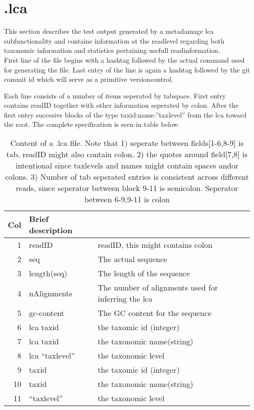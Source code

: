 \documentclass[10pt]{article}
\begin{document}
\section{.lca} \label{sec:lca}
This section describes the test output generated by a metadamage lca subfunctionality and contains information at the readlevel regarding both taxonomic information and statistics pertaining usefull readinformation.\\

First line of the file begins with a hashtag followed by the actual command used for generating the file. Last entry of the line is again a hashtag followed by the git commit id which will serve as a primitive versioncontrol.

Each line consists of a number of items seperated by tabspace. First entry contains readID together with other information seperated by colon. After the first entry succesive blocks of the type taxid:name:''taxlevel'' from the lca toward the root. The complete specification is seen in table below.

\begin{table}[h]
\begin{tabular}{rll}
  \hline
  {\bf Col} & {\bf Brief description} \\
  \hline
  1 & {\sf readID} & readID, this might contains colon\\
  2 & {\sf seq} & The actual sequence\\
  3 & {\sf length(seq)} & The length of the sequence\\
  4 & {\sf nAlignments} & The number of alignments used for inferring the lca\\
  5 & {\sf gc-content} & The GC content for the sequence\\\hline\hline
  6 & {\sf lca taxid} & the taxomic id (integer)\\
  7 & {\sf lca taxid} & the taxonomic name(string)\\
  8 & {\sf lca ``taxlevel''} & the taxonomic level\\\hline\hline
  9 & {\sf taxid} & the taxomic id (integer)\\
  10 & {\sf taxid} & the taxonomic name(string)\\
  11 & {\sf ``taxlevel''} & the taxonomic level\\\hline\hline
\end{tabular}\label{tab2}
\caption{Content of a .lca file. Note that 1) seperate between
  fields[1-6,8-9] is tab, readID might also contain colon. 2) the
  quotes around field[7,8] is intentional since taxlevels and names
  might contain spaces andor colons. 3) Number of tab seperated
  entries is consistent across different reads, since seperator
  between block 9-11 is semicolon. Seperator between 6-9,9-11 is colon}
\end{table}
\end{document}
